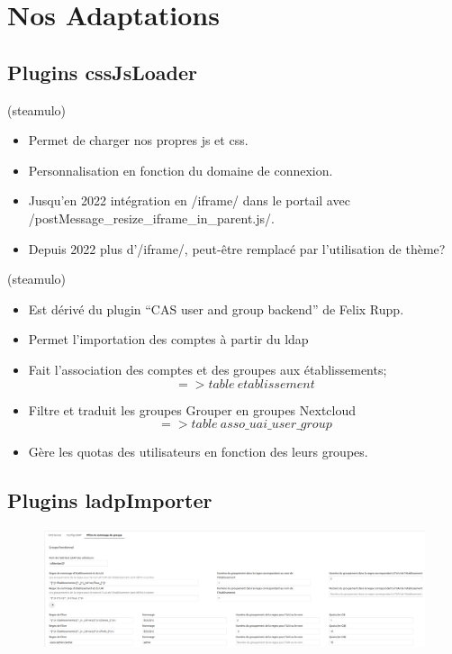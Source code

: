 \section{Nos Adaptations}
\subsection{Plugins cssJsLoader}
\begin{frame}[fragile]{\sub}{(steamulo)}
\begin{itemize}
\item Permet de charger nos propres js et css.
\item Personnalisation en fonction du domaine de connexion.
\item Jusqu'en 2022 intégration en \code/iframe/ dans le portail avec \code/postMessage_resize_iframe_in_parent.js/.
\item Depuis 2022 plus d'\code/iframe/, peut-être remplacé par l'utilisation de thème? 
\end{itemize}
\end{frame} 


\begin{frame}{\sub}{(steamulo)} %
\begin{itemize}
\item Est dérivé du plugin ``CAS user and group backend'' de Felix Rupp.
\item Permet l'importation des comptes à partir du ldap
\item Fait l'association des comptes et des groupes aux établissements;
		{\small $$ => table\ etablissement $$} 
\item Filtre et traduit les groupes Grouper en groupes Nextcloud
		{\small $$ => table\ asso\_uai\_user\_group $$ } 
\item Gère les quotas des utilisateurs en fonction des leurs groupes.
\end{itemize}
\end{frame}

\subsection{Plugins ladpImporter}
\begin{frame}{\sub} %
\begin{figure}
\includegraphics[width=\textwidth, height=0.85\textheight]{ldapimporter.png}
\end{figure}
\end{frame}

